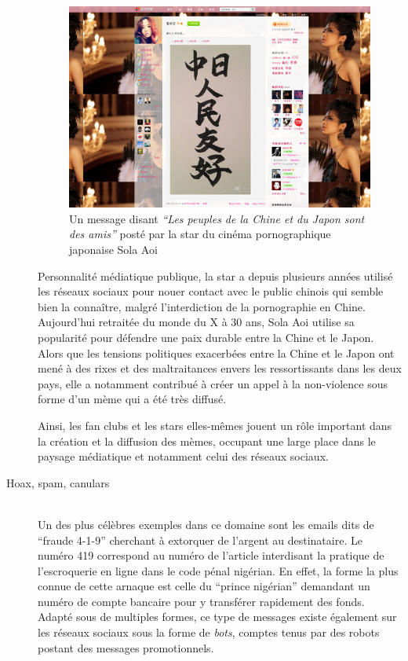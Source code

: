 \begin{description}
\begin{figure}[htpb]
    \centering
    \includegraphics[scale=0.7]{figures/chap2/chapitre2-img22.jpg}
    \caption[La star du X japonaise Sola Aoi sur Sina Weibo]{Un message disant\textit{ {\textquotedblleft}Les peuples de la Chine et du Japon sont des amis{\textquotedblright} }posté par la star du cinéma pornographique japonaise Sola Aoi}
    \label{fig:pornstar-weibo}
\end{figure}

Personnalité médiatique publique, la star a depuis plusieurs années utilisé les réseaux sociaux pour nouer contact avec le public chinois qui semble bien la conna\^itre, malgré l{\textquoteright}interdiction de la pornographie en Chine. Aujourd{\textquoteright}hui retraitée du monde du X à 30 ans, Sola Aoi utilise sa popularité pour défendre une paix durable entre la Chine et le Japon. Alors que les tensions politiques exacerbées entre la Chine et le Japon ont mené à des rixes et des maltraitances envers les ressortissants dans les deux pays, elle a notamment contribué à créer un appel à la non-violence sous forme d'un mème qui a été très diffusé.  

Ainsi, les fan clubs et les stars elles-mêmes jouent un rôle important dans la création et la diffusion des mèmes, occupant une large place dans le paysage médiatique et notamment celui des réseaux sociaux. 


\item[Hoax, spam, canulars]
\hfill \\
Un des plus célèbres exemples dans ce domaine sont les emails dits de {\textquotedblleft}fraude 4-1-9{\textquotedblright} cherchant à extorquer de l{\textquoteright}argent au destinataire. Le numéro 419 correspond au numéro de l{\textquoteright}article interdisant la pratique de l{\textquoteright}escroquerie en ligne dans le code pénal nigérian. En effet, la forme la plus connue de cette arnaque est celle du {\textquotedblleft}prince nigérian{\textquotedblright} demandant un numéro de compte bancaire pour y transférer rapidement des fonds. Adapté sous de multiples formes, ce type de messages existe également sur les réseaux sociaux sous la forme de \textit{bots}, comptes tenus par des robots postant des messages promotionnels.  


\end{description}
